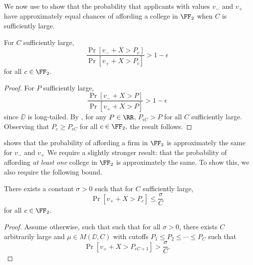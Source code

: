 \documentclass[10pt]{article}
\begin{document}
\begin{ReviewVerbatim}
We now use  to show that the probability that applicants with values $v_-$ and $v_+$ have approximately equal chances of affording a college in $\FF_2$ when $C$ is sufficiently large.

\begin{lemma}\label{lem:apple}
    For $C$ sufficiently large,
    \begin{equation}
        \frac{\Pr[v_- + X > P_c]}{\Pr[v_+ + X > P_c]} > 1 - \epsilon
    \end{equation}
    for all $c\in \FF_2.$
\end{lemma}

\begin{proof}
    For $P$ sufficiently large,
    \begin{equation}
        \frac{\Pr[v_- + X > P]}{\Pr[v_+ + X > P]} > 1 - \epsilon
    \end{equation}
    since $\DD$ is long-tailed. By , for any $P\in \RR$, $P_{\epsilon C} > P$ for all $C$ sufficiently large. Observing that $P_c\ge P_{\epsilon C}$ for all $c\in \FF_2,$ the result follows.
\end{proof}

 shows that the probability of affording a firm in $\FF_2$ is approximately the same for $v_-$ and $v_+$ We require a slightly stronger result: that the probability of affording \textit{at least one} college in $\FF_2$ is approximately the same. To show this, we also require the following bound.

\begin{lemma}
    There exists a constant $\sigma>0$ such that for $C$ sufficiently large,
    \begin{equation}
        \Pr[v_+ + X > P_c] \le \frac{\sigma}{C}
    \end{equation}
    for all $c\in \FF_2.$
\end{lemma}

\begin{proof}
    Assume otherwise, such that such that for all $\sigma > 0$, there exists $C$ arbitrarily large and $\mu \in M(\DD, C)$ with cutoffs $P_1\le P_2\le \cdots \le P_C$ such that
    \begin{equation}
        \Pr[v_+ + X > P_{\epsilon C + 1}] > \frac{\sigma}{C}.
    \end{equation}


\end{proof}
\end{ReviewVerbatim}
\end{document}
